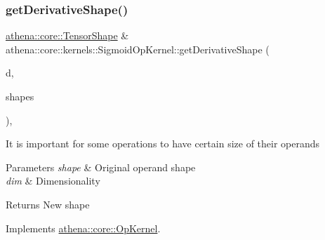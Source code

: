 \mbox{\label{classathena_1_1core_1_1kernels_1_1_sigmoid_op_kernel_af2ba51d6085f6d5326c1ab1281717ea8}} 
\subsubsection{\texorpdfstring{get\+Derivative\+Shape()}{getDerivativeShape()}}
{\footnotesize\ttfamily \mbox{\hyperlink{classathena_1_1core_1_1_tensor_shape}{athena\+::core\+::\+Tensor\+Shape}} \& athena\+::core\+::kernels\+::\+Sigmoid\+Op\+Kernel\+::get\+Derivative\+Shape (\begin{DoxyParamCaption}\item[{int}]{d,  }\item[{const std\+::vector$<$ \mbox{\hyperlink{classathena_1_1core_1_1_tensor_shape}{athena\+::core\+::\+Tensor\+Shape}} \& $>$ \&}]{shapes }\end{DoxyParamCaption})\hspace{0.3cm}{\ttfamily [override]}, {\ttfamily [virtual]}}

It is important for some operations to have certain size of their operands 
\begin{DoxyParams}{Parameters}
{\em shape} & Original operand shape \\
\hline
{\em dim} & Dimensionality \\
\hline
\end{DoxyParams}
\begin{DoxyReturn}{Returns}
New shape 
\end{DoxyReturn}


Implements \mbox{\hyperlink{classathena_1_1core_1_1_op_kernel_aa2367d955810d4e0f3f27b85ae6fe85a}{athena\+::core\+::\+Op\+Kernel}}.

\mbox{\label{classathena_1_1core_1_1kernels_1_1_sigmoid_op_kernel_acb639510462e759a92747cec8c32358b}} 
